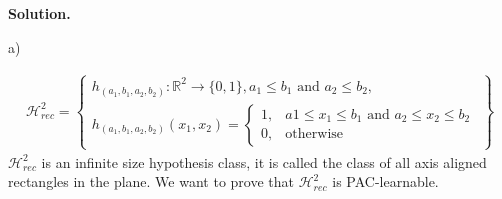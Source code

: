 \documentclass{article}
\newcommand{\<}{\langle}
\renewcommand{\>}{\rangle}
\theoremstyle{definition}
\def\gH{{\mathcal{H}}}
\def\sR{{\mathbb{R}}}
\newcommand{\hrs}{\gH_{rec}^2}
\newcommand{\sRs}{\sR^2}
\newcommand{\hrs}{\gH_{rec}^2}
\newcommand{\sRs}{\sR^2}
\begin{document}
\textbf{Solution.}


a)

\begin{align*}
\hrs = \left\{
  \begin{array}{ll}
   h_{(a_1, b_1, a_2, b_2)} \colon \sRs \rightarrow \{0, 1\},
     a_1 \leq b_1 \text{ and } a_2 \leq b_2, \\
   h_{(a_1, b_1, a_2, b_2)}(x_1, x_2) = 
     \begin{cases}
       1, & a1 \leq x_1 \leq b_1 \text{ and } a_2 \leq x_2 \leq b_2 \\
       0, &\text{otherwise}
     \end{cases}
  \end{array}
        \right\}
\end{align*}
$\hrs$ is an infinite size hypothesis class, it is called the class of all axis aligned
rectangles in the plane. We want to prove that $\hrs$ is PAC-learnable.
\end{document}
